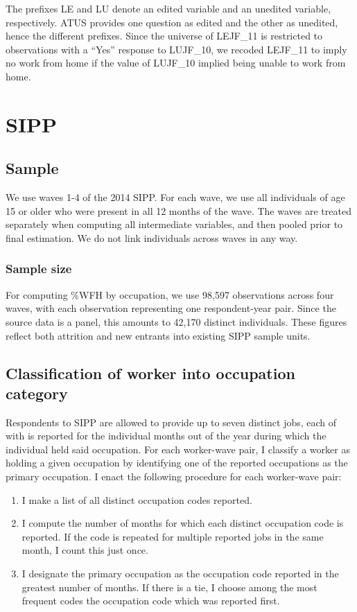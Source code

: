 \documentclass{article}
\begin{document}
The prefixes LE and LU denote an edited variable and an unedited variable, respectively. ATUS provides one question as edited and the other as unedited, hence the different prefixes. Since the universe of LEJF\_11 is restricted to observations with a ``Yes'' response to LUJF\_10, we recoded LEJF\_11 to imply no work from home if the value of LUJF\_10 implied being unable to work from home.

\section{SIPP}
\subsection{Sample}
We use waves 1-4 of the 2014 SIPP. For each wave, we use all individuals of age 15 or older who were present in all 12 months of the wave. The waves are treated separately when computing all intermediate variables, and then pooled prior to final estimation. We do not link individuals across waves in any way.

\subsubsection{Sample size}
For computing \%WFH by occupation, we use 98,597 observations across four waves, with each observation representing one respondent-year pair. Since the source data is a panel, this amounts to 42,170 distinct individuals. These figures reflect both attrition and new entrants into existing SIPP sample units. 

\subsection{Classification of worker into occupation category}
\label{sipp_occupation}
Respondents to SIPP are allowed to provide up to seven distinct jobs, each of with is reported for the individual months out of the year during which the individual held said occupation.
For each worker-wave pair, I classify a worker as holding a given occupation by identifying one of the reported occupations as the primary occupation. I enact the following procedure for each worker-wave pair:
\begin{enumerate}
\item I make a list of all distinct occupation codes reported.
\item I compute the number of months for which each distinct occupation code is reported. If the code is repeated for multiple reported jobs in the same month, I count this just once.
\item I designate the primary occupation as the occupation code reported in the greatest number of months. If there is a tie, I choose among the most frequent codes the occupation code which was reported first.
\end{enumerate}
\end{document}

